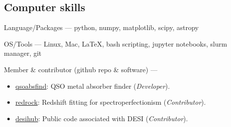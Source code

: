 \documentclass[12pt,letterpaper]{article}
\begin{document}
\subsection{Computer skills}
\begin{list}{}{\cvlist}
\item Language/Packages ---
    python, numpy, matplotlib, scipy, astropy
\item OS/Tools --- Linux, Mac, \LaTeX, bash scripting, jupyter notebooks, slurm manager, git
\item Member \& contributor (github repo \& software) ---
    \begin{itemize}
        \item[] \href{https://github.com/abhi0395/qsoabsfind}{qsoabsfind}: QSO metal absorber finder (\textit{Developer}).
      \item[] \href{https://github.com/desihub/redrock}{redrock}: Redshift fitting for spectroperfectionism (\textit{Contributor}).
      \item[] \href{https://github.com/desihub}{desihub}: Public code associated with DESI (\textit{Contributor}).
  \end{itemize}
\end{list}

\end{document}
